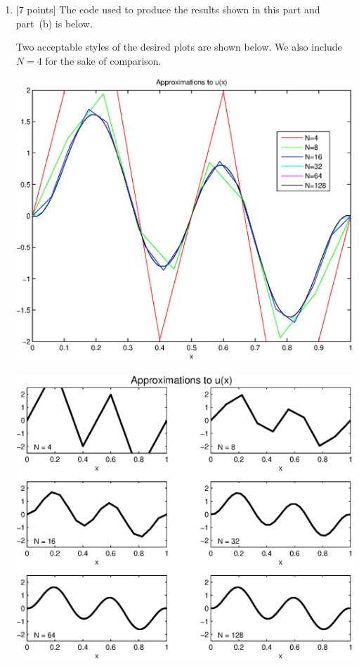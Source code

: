 \begin{solution}

\begin{enumerate}
\item {[7 points]} The code used to produce the results shown in this part and part~(b) is below.



Two acceptable styles of the desired plots are shown below. We also include $N=4$ for the sake of comparison.

\begin{center}
\includegraphics[scale=0.7]{together_a}
\end{center}

\begin{center}
\includegraphics[scale=0.7]{separate_a}
\end{center}


\end{enumerate}
\end{solution}
